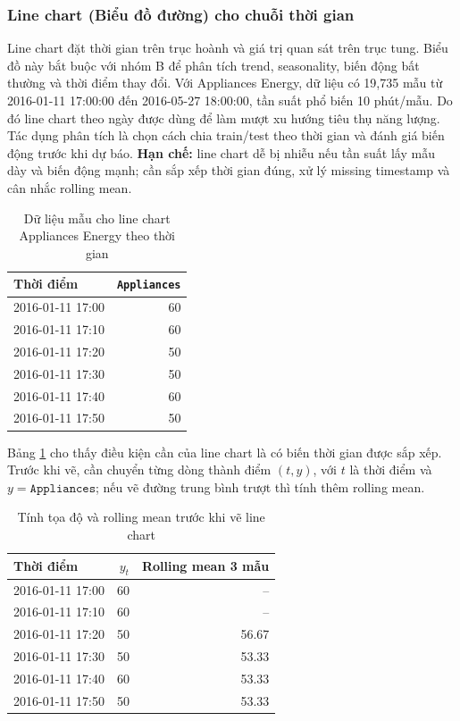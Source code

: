 \subsubsection{Line chart (Biểu đồ đường) cho chuỗi thời gian}

Line chart đặt thời gian trên trục hoành và giá trị quan sát trên trục tung. Biểu đồ này bắt buộc với nhóm B để phân tích trend, seasonality, biến động bất thường và thời điểm thay đổi. Với Appliances Energy, dữ liệu có 19,735 mẫu từ 2016-01-11 17:00:00 đến 2016-05-27 18:00:00, tần suất phổ biến 10 phút/mẫu. Do đó line chart theo ngày được dùng để làm mượt xu hướng tiêu thụ năng lượng. Tác dụng phân tích là chọn cách chia train/test theo thời gian và đánh giá biến động trước khi dự báo. \textbf{Hạn chế:} line chart dễ bị nhiễu nếu tần suất lấy mẫu dày và biến động mạnh; cần sắp xếp thời gian đúng, xử lý missing timestamp và cân nhắc rolling mean.

\begin{table}[H]
\centering
\caption{Dữ liệu mẫu cho line chart Appliances Energy theo thời gian}
\label{tab:chapter1_line_sample_data}
\small
\begin{tabular}{lr}
\toprule
Thời điểm & \texttt{Appliances} \\
\midrule
2016-01-11 17:00 & 60 \\
2016-01-11 17:10 & 60 \\
2016-01-11 17:20 & 50 \\
2016-01-11 17:30 & 50 \\
2016-01-11 17:40 & 60 \\
2016-01-11 17:50 & 50 \\
\bottomrule
\end{tabular}
\end{table}

Bảng \ref{tab:chapter1_line_sample_data} cho thấy điều kiện cần của line chart là có biến thời gian được sắp xếp. Trước khi vẽ, cần chuyển từng dòng thành điểm $(t,y)$, với $t$ là thời điểm và $y=\texttt{Appliances}$; nếu vẽ đường trung bình trượt thì tính thêm rolling mean.

\begin{table}[H]
\centering
\caption{Tính tọa độ và rolling mean trước khi vẽ line chart}
\label{tab:chapter1_line_calc}
\small
\begin{tabular}{lrr}
\toprule
Thời điểm & $y_t$ & Rolling mean 3 mẫu \\
\midrule
2016-01-11 17:00 & 60 & -- \\
2016-01-11 17:10 & 60 & -- \\
2016-01-11 17:20 & 50 & 56.67 \\
2016-01-11 17:30 & 50 & 53.33 \\
2016-01-11 17:40 & 60 & 53.33 \\
2016-01-11 17:50 & 50 & 53.33 \\
\bottomrule
\end{tabular}
\end{table}

